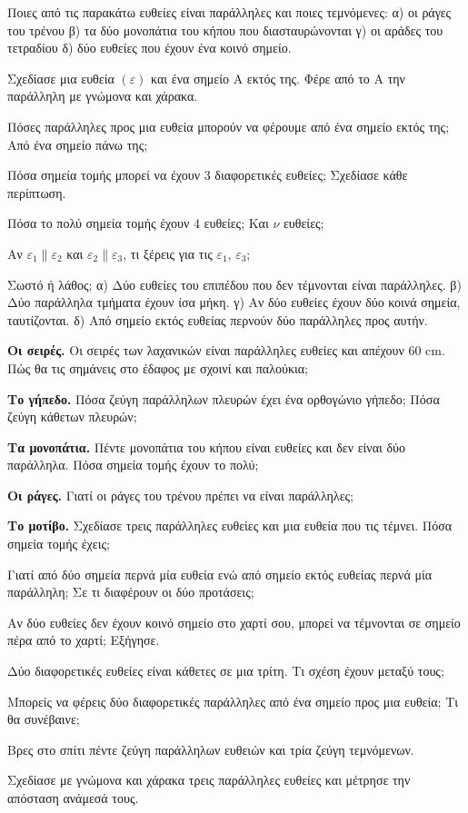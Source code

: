 

\ex Ποιες από τις παρακάτω ευθείες είναι παράλληλες και ποιες τεμνόμενες: α) οι ράγες του τρένου \quad β) τα δύο μονοπάτια του κήπου που διασταυρώνονται \quad γ) οι αράδες του τετραδίου \quad δ) δύο ευθείες που έχουν ένα κοινό σημείο.

\ex Σχεδίασε μια ευθεία $(\varepsilon)$ και ένα σημείο $\mathrm{Α}$ εκτός της. Φέρε από το $\mathrm{Α}$ την παράλληλη με γνώμονα και χάρακα.

\ex Πόσες παράλληλες προς μια ευθεία μπορούν να φέρουμε από ένα σημείο εκτός της; Από ένα σημείο πάνω της;

\ex Πόσα σημεία τομής μπορεί να έχουν $3$ διαφορετικές ευθείες; Σχεδίασε κάθε περίπτωση.

\ex Πόσα το πολύ σημεία τομής έχουν $4$ ευθείες; Και $\nu$ ευθείες;

\ex Αν $\varepsilon_1\parallel\varepsilon_2$ και $\varepsilon_2\parallel\varepsilon_3$, τι ξέρεις για τις $\varepsilon_1$, $\varepsilon_3$;

\ex Σωστό ή λάθος; α) Δύο ευθείες του επιπέδου που δεν τέμνονται είναι παράλληλες. \quad β) Δύο παράλληλα τμήματα έχουν ίσα μήκη. \quad γ) Αν δύο ευθείες έχουν δύο κοινά σημεία, ταυτίζονται. \quad δ) Από σημείο εκτός ευθείας περνούν δύο παράλληλες προς αυτήν.


\ex \textbf{Οι σειρές.} Οι σειρές των λαχανικών είναι παράλληλες ευθείες και απέχουν $60$ cm. Πώς θα τις σημάνεις στο έδαφος με σχοινί και παλούκια;

\ex \textbf{Το γήπεδο.} Πόσα ζεύγη παράλληλων πλευρών έχει ένα ορθογώνιο γήπεδο; Πόσα ζεύγη κάθετων πλευρών;

\ex \textbf{Τα μονοπάτια.} Πέντε μονοπάτια του κήπου είναι ευθείες και δεν είναι δύο παράλληλα. Πόσα σημεία τομής έχουν το πολύ;

\ex \textbf{Οι ράγες.} Γιατί οι ράγες του τρένου πρέπει να είναι παράλληλες;

\ex \textbf{Το μοτίβο.} Σχεδίασε τρεις παράλληλες ευθείες και μια ευθεία που τις τέμνει. Πόσα σημεία τομής έχεις;


\ex Γιατί από δύο σημεία περνά μία ευθεία ενώ από σημείο εκτός ευθείας περνά μία παράλληλη; Σε τι διαφέρουν οι δύο προτάσεις;

\ex Αν δύο ευθείες δεν έχουν κοινό σημείο στο χαρτί σου, μπορεί να τέμνονται σε σημείο πέρα από το χαρτί; Εξήγησε.

\ex Δύο διαφορετικές ευθείες είναι κάθετες σε μια τρίτη. Τι σχέση έχουν μεταξύ τους;

\ex Μπορείς να φέρεις δύο διαφορετικές παράλληλες από ένα σημείο προς μια ευθεία; Τι θα συνέβαινε;


\ex Βρες στο σπίτι πέντε ζεύγη παράλληλων ευθειών και τρία ζεύγη τεμνόμενων.

\ex Σχεδίασε με γνώμονα και χάρακα τρεις παράλληλες ευθείες και μέτρησε την απόσταση ανάμεσά τους.

